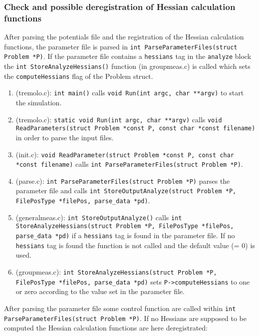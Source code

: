 \documentclass[11pt]{article}
\begin{document}
\subsubsection{Check and possible deregistration of Hessian calculation functions}
\label{sec-1-3-3}
After parsing the potentials file and the registration of the Hessian calculation functions, the parameter file is parsed in \texttt{int ParseParameterFiles(struct Problem *P)}.
If the parameter file contains a \texttt{hessians} tag in the \texttt{analyze} block the \texttt{int StoreAnalyzeHessians()} function (in groupmeas.c) is called which sets the \texttt{computeHessians} flag of the Problem struct.
\begin{enumerate}
\item (tremolo.c): \texttt{int main()} calls \texttt{void Run(int argc, char **argv)} to start the simulation.
\item (tremolo.c): \texttt{static void Run(int argc, char **argv)} calls \texttt{void ReadParameters(struct Problem *const P, const char *const filename)} in order to parse the input files.
\item (init.c): \texttt{void ReadParameter(struct Problem *const P, const char *const filename)} calls \texttt{int ParseParameterFiles(struct Problem *P)}.
\item (parse.c): \texttt{int ParseParameterFiles(struct Problem *P)} parses the parameter file and calls \texttt{int StoreOutputAnalyze(struct Problem *P, FilePosType *filePos, parse\_data *pd)}.
\item (generalmeas.c): \texttt{int StoreOutputAnalyze()} calls \texttt{int StoreAnalyzeHessians(struct Problem *P, FilePosType *filePos, parse\_data *pd)} if a \texttt{hessians} tag is found in the parameter file. If no \texttt{hessians} tag is found the function is not called and the default value (= 0) is used.
\item (groupmeas.c): \texttt{int StoreAnalyzeHessians(struct Problem *P, FilePosType *filePos, parse\_data *pd)} sets \texttt{P->computeHessians} to one or zero according to the value set in the parameter file.
\end{enumerate}
After parsing the parameter file some control function are called within \texttt{int ParseParameterFiles(struct Problem *P)}. If no Hessians are supposed to be computed the Hessian calculation functions are here deregistrated:
\end{document}
